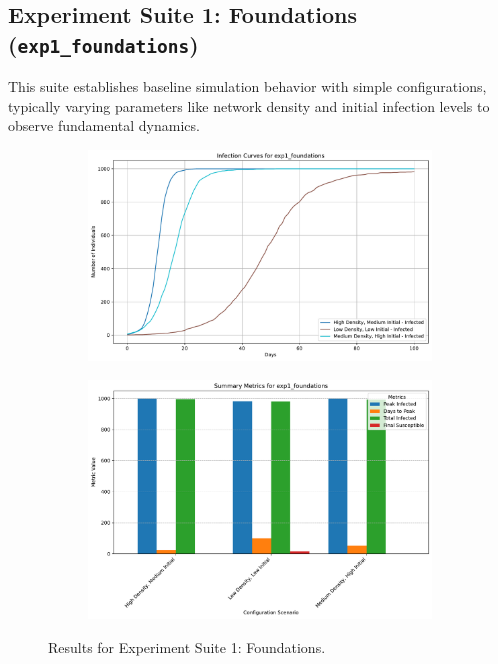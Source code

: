 \documentclass[12pt]{article}
\begin{document}
\subsection[Exp Suite 1: Foundations]{Experiment Suite 1: Foundations (\texttt{exp1\_foundations})}
This suite establishes baseline simulation behavior with simple configurations, typically varying parameters like network density and initial infection levels to observe fundamental dynamics.
\begin{figure}[htbp!]
\centering
\begin{subfigure}{.48\textwidth}
\centering
\includegraphics[width=\linewidth]{../results/exp1_foundations/infection_curves.pdf}
\label{fig:exp1_curves}
\end{subfigure}
\hfill
\begin{subfigure}{.48\textwidth}
\centering
\includegraphics[width=\linewidth]{../results/exp1_foundations/summary_metrics_grouped_summary.pdf}
\label{fig:exp1_summary}
\end{subfigure}
\caption[Exp Suite 1 Results]{Results for Experiment Suite 1: Foundations.}
\label{fig:exp1_results}
\end{figure}
\end{document}
